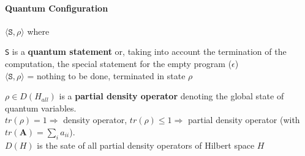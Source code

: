 \documentclass[10pt]{report}
\begin{document}
\paragraph{Quantum Configuration} $\langle \texttt{S},\rho\rangle$ where
\begin{list}{}{}
	\item \texttt{S} is a \textbf{quantum statement} or, taking into account the termination of the computation, the special statement for the empty program ($\epsilon$)\\
	$\langle \texttt{S},\rho\rangle$ = nothing to be done, terminated in state $\rho$
	\item $\rho\in D(H_{all})$ is a \textbf{partial density operator} denoting the global state of quantum variables.\\
	$tr(\rho)=1\Rightarrow$ density operator, $tr(\rho)\leq 1\Rightarrow$ partial density operator (with $tr(\mathbf{A}) = \sum_i a_{ii}$).\\
	$D(H)$ is the sate of all partial density operators of Hilbert space $H$
\end{list}
\end{document}
